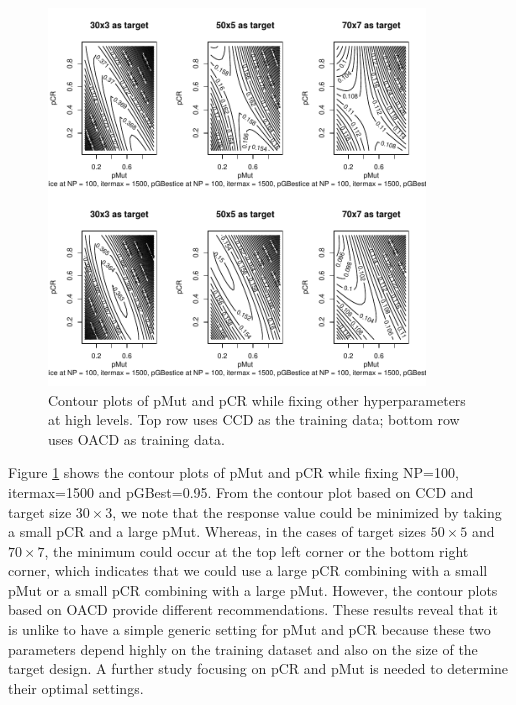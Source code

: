 \documentclass [PhD] {package/uclathes}
\begin{document}

\begin{figure}
\centering
\includegraphics[height=10cm, width=\textwidth]{chapters/DE/pdfs/contours}
\caption{Contour plots of pMut and pCR while fixing other hyperparameters at high levels. Top row uses CCD as the training data; bottom row uses OACD as training data.}
\label{fig:contours}
\end{figure}

Figure \ref{fig:contours} shows the contour plots of pMut and pCR while fixing NP=100, itermax=1500 and pGBest=0.95.  From the contour plot based on CCD and target size $30\times 3$, we note that the response value could be minimized by taking a small pCR and a large pMut. %
Whereas, in the cases of target sizes $50\times5$ and $70\times 7$, the minimum could occur at the top left corner or the bottom right corner,
which indicates that we could use a large pCR combining with  a small pMut or a small pCR combining with a large pMut. However, the contour plots based on OACD provide different recommendations.
These results reveal that it is unlike to have a simple generic setting for pMut and pCR because these two parameters depend highly on the training dataset and also on the size of the target design. %
A further study focusing on pCR and pMut is needed to determine their optimal settings.
\end{document}

